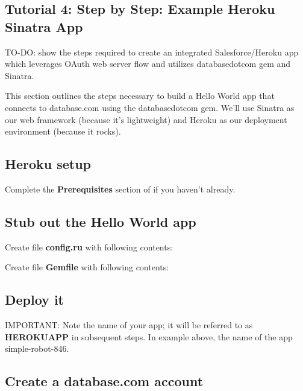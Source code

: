 \documentclass{article}
\begin{document}
 
\hypertarget{tutorial_4_step_by_step_example_heroku_sinatra_app}{}\subsection*{{Tutorial 4: Step by Step: Example Heroku Sinatra App}}\label{tutorial_4_step_by_step_example_heroku_sinatra_app}

TO-DO: show the steps required to create an integrated Salesforce/Heroku app which leverages OAuth web server flow and utilizes databasedotcom gem and Sinatra.

This section outlines the steps necessary to build a Hello World app that connects to database.com using the databasedotcom gem. We'{}ll use Sinatra as our web framework (because it'{}s lightweight) and Heroku as our deployment environment (because it rocks).

\hypertarget{heroku_setup}{}\subsection*{{Heroku setup}}\label{heroku_setup}

Complete the \textbf{\textbf{Prerequisites}} section of  if you haven'{}t already.

\hypertarget{stub_out_the_hello_world_app}{}\subsection*{{Stub out the Hello World app}}\label{stub_out_the_hello_world_app}

Create file \textbf{config.ru} with following contents:

Create file \textbf{Gemfile} with following contents:

\hypertarget{deploy_it}{}\subsection*{{Deploy it}}\label{deploy_it}

IMPORTANT: Note the name of your app; it will be referred to as \textbf{HEROKUAPP} in subsequent steps. In example above, the name of the app simple-robot-846.

\hypertarget{create_a_databasecom_account}{}\subsection*{{Create a database.com account}}\label{create_a_databasecom_account}
\end{document}
